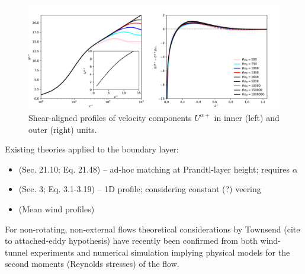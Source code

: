 \documentclass[a4paper,11pt]{article}
\begin{document}
%
\begin{figure}
  \includegraphics[width=\textwidth]{../plot/u_profile.pdf}
  \caption{Shear-aligned profiles of velocity components $U^{\alpha+}$ in inner (left) and outer (right) units.} 
\end{figure} 

Existing theories applied to the boundary layer:
\begin{itemize}
\item \cite{Etling:2002kx, Emeis:2018vq}  (Sec. 21.10; Eq. 21.48) -- ad-hoc matching at Prandtl-layer height; requires $\alpha$ 
\item \cite{Emeis:2007cy} (Sec. 3; Eq. 3.1-3.19) -- 1D profile; considering constant (?) veering 
\item \cite{Gryning:2007dy} (Mean wind profiles)
\end{itemize}

For non-rotating, non-external flows theoretical considerations by Townsend (cite to attached-eddy hypothesis)
have recently been confirmed from both wind-tunnel  experiments and numerical simulation \cite{Ng:2011bk,Marusic:2013hf}
implying physical models for the second moments (Reynolds stresses) of the flow.
%
\end{document}
